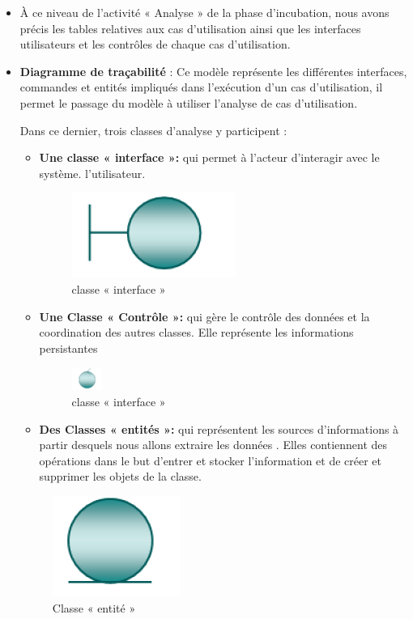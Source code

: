 \documentclass[12 pt]{report}
\begin{document}
\begin{itemize}[font=\color{black} \Large, label=]
\item À ce niveau de l’activité « Analyse » de la phase d’incubation, nous avons précis les tables relatives aux cas d’utilisation ainsi que les interfaces utilisateurs et les contrôles de chaque cas d’utilisation.
\item \textbf{ Diagramme de traçabilité} : Ce modèle représente les différentes interfaces,
commandes et entités impliqués dans l'exécution d'un cas d'utilisation, il permet le
passage du modèle à utiliser l'analyse de cas d’utilisation.


 Dans ce
dernier, trois classes d’analyse y participent :
\begin{itemize}[font=\color{black} \Large, label=]
\item \textbf{Une classe « interface »:}
 qui permet à
l’acteur d’interagir avec le
système. 
l’utilisateur.

\begin{figure}[h]
 \begin{center}
\includegraphics[width= 1 cm ,height= 1 cm]{int.png}
\caption{ classe « interface »}
\end{center}
\end{figure}


\item \textbf{Une Classe « Contrôle »:}
qui gère le contrôle des données
et la coordination des autres
classes. Elle représente les informations persistantes
\begin{figure}[h]
 \begin{center}
\includegraphics[width= 1cm ,height= 1 cm]{cntrl.png}
\caption{ classe « interface »}
\end{center}
\end{figure}

\item \textbf{Des Classes « entités »:}
qui
représentent les sources
d’informations à partir
desquels nous allons extraire
les données . Elles contiennent
des opérations dans le but d’entrer et stocker
l’information et de créer et
supprimer les objets de la
classe.
\end{itemize}
\begin{figure}[h]
 \begin{center}
\includegraphics[width= 1 cm ,height= 1 cm]{entite.png}
\caption{ Classe « entité »}
\end{center}
\end{figure}

\end{itemize}
\end{document}
